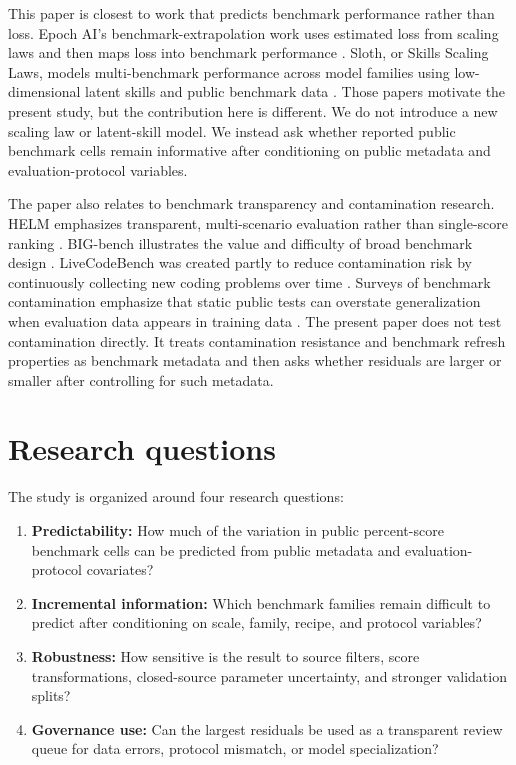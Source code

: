 \documentclass[11pt]{article}
\begin{document}
This paper is closest to work that predicts benchmark performance rather than loss. Epoch AI's benchmark-extrapolation work uses estimated loss from scaling laws and then maps loss into benchmark performance \citep{owen2023predictable}. Sloth, or Skills Scaling Laws, models multi-benchmark performance across model families using low-dimensional latent skills and public benchmark data \citep{polo2024sloth}. Those papers motivate the present study, but the contribution here is different. We do not introduce a new scaling law or latent-skill model. We instead ask whether reported public benchmark cells remain informative after conditioning on public metadata and evaluation-protocol variables.

The paper also relates to benchmark transparency and contamination research. HELM emphasizes transparent, multi-scenario evaluation rather than single-score ranking \citep{liang2022helm}. BIG-bench illustrates the value and difficulty of broad benchmark design \citep{srivastava2022bigbench}. LiveCodeBench was created partly to reduce contamination risk by continuously collecting new coding problems over time \citep{jain2024livecodebench}. Surveys of benchmark contamination emphasize that static public tests can overstate generalization when evaluation data appears in training data \citep{xu2024contamination}. The present paper does not test contamination directly. It treats contamination resistance and benchmark refresh properties as benchmark metadata and then asks whether residuals are larger or smaller after controlling for such metadata.

\section{Research questions}
The study is organized around four research questions:
\begin{enumerate}[leftmargin=*]
\item \textbf{Predictability:} How much of the variation in public percent-score benchmark cells can be predicted from public metadata and evaluation-protocol covariates?
\item \textbf{Incremental information:} Which benchmark families remain difficult to predict after conditioning on scale, family, recipe, and protocol variables?
\item \textbf{Robustness:} How sensitive is the result to source filters, score transformations, closed-source parameter uncertainty, and stronger validation splits?
\item \textbf{Governance use:} Can the largest residuals be used as a transparent review queue for data errors, protocol mismatch, or model specialization?
\end{enumerate}
\end{document}
